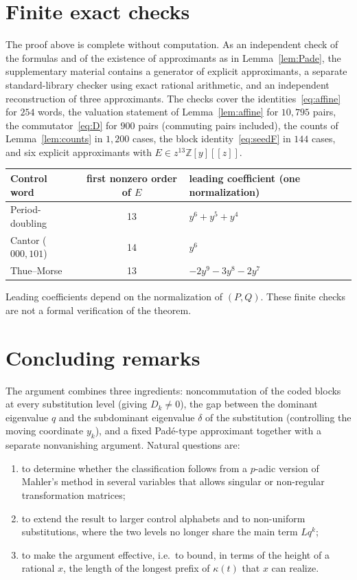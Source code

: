 \documentclass[11pt]{amsart}
\theoremstyle{remark}
\theoremstyle{definition}
\numberwithin{equation}{section}
\newcommand{\Z}{\mathbb{Z}}
\begin{document}
\section{Finite exact checks}\label{sec:checks}

The proof above is complete without computation. As an independent check of the formulas and of the existence of approximants as in Lemma~\ref{lem:Pade}, the supplementary material contains a generator of explicit approximants, a separate standard-library checker using exact rational arithmetic, and an independent reconstruction of three approximants. The checks cover the identities~\eqref{eq:affine} for $254$ words, the valuation statement of Lemma~\ref{lem:affine} for $10{,}795$ pairs, the commutator~\eqref{eq:D} for $900$ pairs (commuting pairs included), the counts of Lemma~\ref{lem:counts} in $1{,}200$ cases, the block identity~\eqref{eq:seedF} in $144$ cases, and six explicit approximants with $E\in z^{13}\Z[y][[z]]$.

\begin{center}
\begin{tabular}{lcl}
\toprule
Control word & first nonzero order of $E$ & leading coefficient (one normalization)\\
\midrule
Period-doubling & 13 & $y^6+y^5+y^4$\\
Cantor ($000,101$) & 14 & $y^6$\\
Thue--Morse & 13 & $-2y^9-3y^8-2y^7$\\
\bottomrule
\end{tabular}
\end{center}

\noindent Leading coefficients depend on the normalization of $(P,Q)$. These finite checks are not a formal verification of the theorem.

\section{Concluding remarks}\label{sec:remarks}

The argument combines three ingredients: noncommutation of the coded blocks at every substitution level (giving $D_k\ne0$), the gap between the dominant eigenvalue $q$ and the subdominant eigenvalue $\delta$ of the substitution (controlling the moving coordinate $y_k$), and a fixed Pad\'e-type approximant together with a separate nonvanishing argument. Natural questions are:
\begin{enumerate}[label=(\roman*)]
\item to determine whether the classification follows from a $p$-adic version of Mahler's method in several variables that allows singular or non-regular transformation matrices;
\item to extend the result to larger control alphabets and to non-uniform substitutions, where the two levels no longer share the main term $Lq^k$;
\item to make the argument effective, i.e.\ to bound, in terms of the height of a rational $x$, the length of the longest prefix of $\kappa(t)$ that $x$ can realize.
\end{enumerate}
\end{document}
